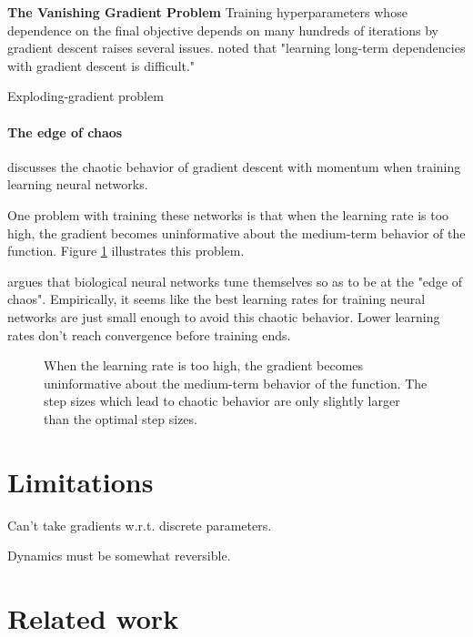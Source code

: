 \documentclass{article}
\begin{document}
\textbf{The Vanishing Gradient Problem}
Training hyperparameters whose dependence on the final objective depends on many hundreds of iterations by gradient descent raises several issues.
\citet{bengio1994learning} noted that "learning long-term dependencies with gradient descent is difficult."

Exploding-gradient problem~\cite{pascanu2012understanding}

\paragraph{The edge of chaos}
\citet*[Chapter 4]{pearlmutter1996investigation} discusses the chaotic behavior of gradient descent with momentum when training learning neural networks.

One problem with training these networks is that when the learning rate is too high, the gradient becomes uninformative about the medium-term behavior of the function.
Figure \ref{fig:chaos} illustrates this problem.

\cite{pearlmutter2009sleep} argues that biological neural networks tune themselves so as to be at the "edge of chaos".
Empirically, it seems like the best learning rates for training neural networks are just small enough to avoid this chaotic behavior.
Lower learning rates don't reach convergence before training ends.


\begin{figure}[h!]
\vskip 0.2in
\begin{center}
\caption{When the learning rate is too high, the gradient becomes uninformative about the medium-term behavior of the function.
The step sizes which lead to chaotic behavior are only slightly larger than the optimal step sizes.}
\label{fig:chaos}
\end{center}
\vskip -0.2in
\end{figure} 



\section{Limitations}

Can't take gradients w.r.t. discrete parameters.

Dynamics must be somewhat reversible.


\section{Related work}
\end{document}

